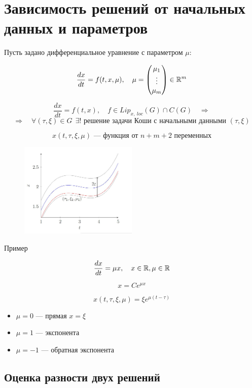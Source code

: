 \newpage

\section{Зависимость решений от начальных данных и параметров}

Пусть задано дифференциальное уравнение с параметром $\mu$:

$$\frac{dx}{dt} = f(t, x, \mu), \quad \mu = \begin{pmatrix}
  \mu_1 \\
  \vdots \\
  \mu_m
\end{pmatrix} \in \mathbb{R}^m$$

$$\frac{dx}{dt} = f(t, x), \quad f\in Lip_{x,\ loc}(G) \cap C(G) \quad \Rightarrow$$
$$\Rightarrow \quad \forall (\tau, \xi) \in G\ \ \exists!
\text{ решение задачи Коши с начальными данными } (\tau, \xi)$$

$$x(t, \tau, \xi, \mu) \text{ --- функция от $n+m+2$ переменных}$$


\begin{figure}
\includegraphics[width = 0.5\textwidth]{images/Parametrs1.JPG}
\end{figure}

Пример

$$\frac{dx}{dt} = \mu x, \quad x \in \mathbb{R}, \mu \in \mathbb{R}$$

$$x = Ce^{\mu x}$$

$$x(t, \tau, \xi, \mu) = \xi e^{\mu (t - \tau)}$$

\begin{itemize}
  \item $\mu = 0$ --- прямая $x = \xi$
  \item $\mu = 1$ --- экспонента
  \item $\mu = -1$ --- обратная экспонента
\end{itemize}


\vspace{10mm}
\subsection{Оценка разности двух решений}

